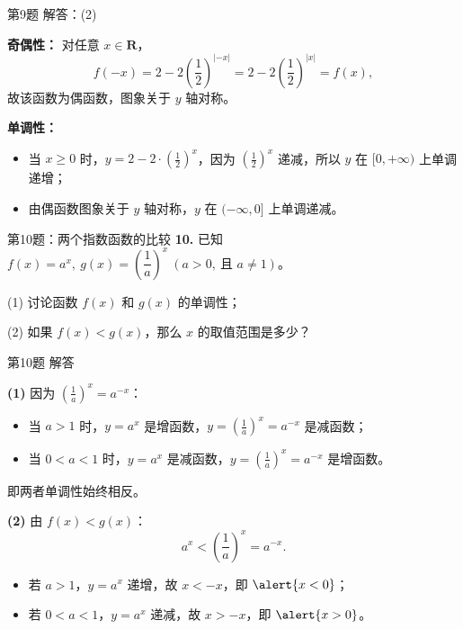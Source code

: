 \documentclass[10pt,aspectratio=169,serif,fleqn]{beamer}
\begin{document}
\begin{frame}[t]{第9题 解答：(2)}
\begin{tcolorbox}[colback=orange!10,colframe=orange,title=\textbf{解：(2)}]
\textbf{奇偶性：} 对任意 $x\in\mathbf{R}$，
\[
f(-x)=2-2\left(\frac12\right)^{|-x|}=2-2\left(\frac12\right)^{|x|}=f(x),
\]
故该函数为\alert{偶函数}，图象关于 $y$ 轴对称。

\vspace{0.6em}
\textbf{单调性：}
\begin{itemize}
  \item 当 $x\ge 0$ 时，$y=2-2\cdot\left(\frac12\right)^{x}$，因为 $\left(\frac12\right)^{x}$ 递减，所以 $y$ 在 $[0,+\infty)$ 上\alert{单调递增}；
  \item 由偶函数图象关于 $y$ 轴对称，$y$ 在 $(-\infty,0]$ 上\alert{单调递减}。
\end{itemize}
\end{tcolorbox}
\end{frame}

\begin{frame}[t]{第10题：两个指数函数的比较}
\textbf{10.} 已知 $f(x)=a^{x},\ g(x)=\left(\dfrac{1}{a}\right)^{x}\ (a>0,\ \text{且 }a\ne 1)$。

(1) 讨论函数 $f(x)$ 和 $g(x)$ 的单调性；

(2) 如果 $f(x)<g(x)$，那么 $x$ 的取值范围是多少？
\end{frame}

\begin{frame}[t]{第10题 解答}
\begin{tcolorbox}[colback=orange!10,colframe=orange,title=\textbf{解}]
\textbf{(1)} 因为 $\left(\frac1a\right)^{x}=a^{-x}$：
\begin{itemize}
  \item 当 $a>1$ 时，$y=a^{x}$ 是增函数，$y=\left(\frac1a\right)^{x}=a^{-x}$ 是减函数；
  \item 当 $0<a<1$ 时，$y=a^{x}$ 是减函数，$y=\left(\frac1a\right)^{x}=a^{-x}$ 是增函数。
\end{itemize}
即两者单调性始终相反。

\vspace{0.6em}
\textbf{(2)} 由 $f(x)<g(x)$：
\[
a^{x}<\left(\frac1a\right)^{x}=a^{-x}.
\]
\begin{itemize}
  \item 若 $a>1$，$y=a^{x}$ 递增，故 $x<-x$，即 $\alert{x<0}$；
  \item 若 $0<a<1$，$y=a^{x}$ 递减，故 $x>-x$，即 $\alert{x>0}$。
\end{itemize}
\end{tcolorbox}
\end{frame}
\end{document}

